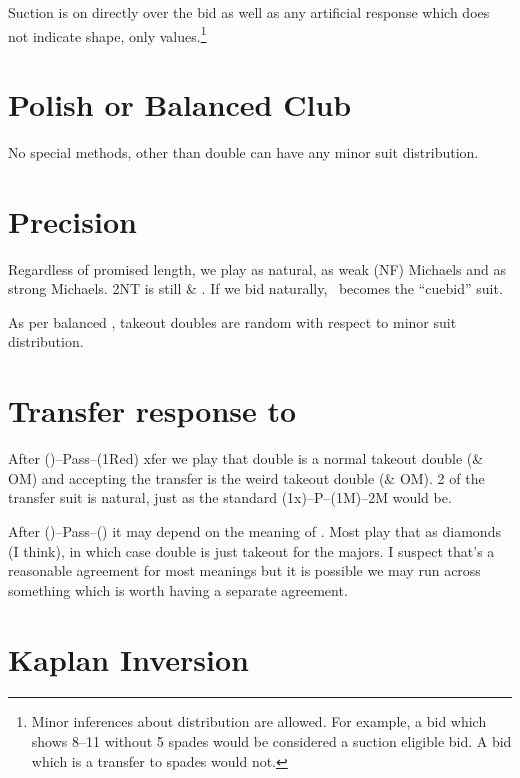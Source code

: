 \documentclass[tom-ari]{subfile}
\begin{document}
	Suction is on directly over the  bid as well as any artificial response which does not indicate shape, only values.\footnote{Minor inferences about distribution are allowed. For example, a  bid which shows 8--11 without 5 spades would be considered a suction eligible bid. A  bid which is a transfer to spades would not.}
	
	\section{Polish or Balanced Club}
	
	No special methods, other than double can have any minor suit distribution.
	
	
	\section[Precision 1D]{Precision }
	
	Regardless of promised length, we play  as natural,  as weak (NF) Michaels and  as strong Michaels. 2NT is still \heartsuit \& \clubsuit. If we bid  naturally, \clubsuit ~becomes the ``cuebid'' suit.
	
	As per balanced , takeout doubles are random with respect to minor suit distribution.
	
	\section[Transfer response to 1C]{Transfer response to }
	
	After ()--Pass--(1Red) xfer we play that double is a normal takeout double (\diamondsuit \& OM) and accepting the transfer is the weird takeout double (\clubsuit \& OM). 2 of the transfer suit is natural, just as the standard (1x)--P--(1M)--2M would be.
	
	After ()--Pass--() it may depend on the meaning of . Most play that as diamonds (I think), in which case double is just takeout for the majors. I suspect that's a reasonable agreement for most  meanings but it is possible we may run across something which is worth having a separate agreement.
	
	\section{Kaplan Inversion}
	
\end{document}
